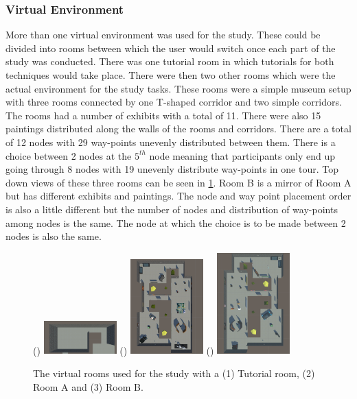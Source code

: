 \subsubsection{Virtual Environment}
\label{subsubsection DPUS SP SS: Virtual Environment} 
More than one virtual environment was used for the study. These could be divided into rooms between which the user would switch once each part of the study was conducted. There was one tutorial room in which tutorials for both techniques would take place. There were then two other rooms which were the actual environment for the study tasks. These rooms were a simple museum setup with three rooms connected by one T-shaped corridor and two simple corridors. The rooms had a number of exhibits with a total of 11. There were also 15 paintings distributed along the walls of the rooms and corridors. There are a total of 12 nodes with 29 way-points unevenly distributed between them. There is a choice between 2 nodes at the $5^{th}$ node meaning that participants only end up going through 8 nodes with 19 unevenly distribute way-points in one tour. Top down views of these three rooms can be seen in \cref{fig:study-environment}. Room B is a mirror of Room A but has different exhibits and paintings. The node and way point placement order is also a little different but the number of nodes and distribution of way-points among nodes is the same. The node at which the choice is to be made between 2 nodes is also the same. 

\begin{figure}[]
	()
	\includegraphics[width=0.25\textwidth]{images/tutorial-room.pdf}
	()
	\includegraphics[width=0.25\textwidth]{images/museum-1-objects.pdf}
	()
	\includegraphics[width=0.25\textwidth]{images/museum-2-objects.pdf}
	\caption{The virtual rooms used for the study with a (1) Tutorial room, (2) Room A and (3) Room B.}
	\label{fig:study-environment}
\end{figure}

